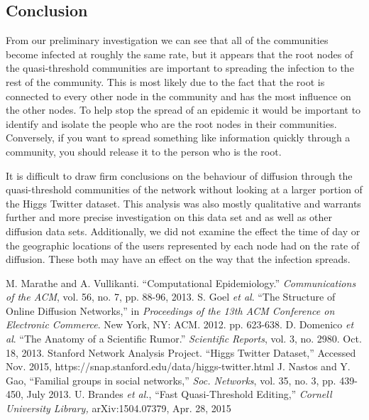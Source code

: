 \documentclass[12pt, oneside, openany]{article} %
\begin{document}
\subsection{Conclusion}
From our preliminary investigation we can see that all of the communities become infected at roughly the same rate, but it appears that the root nodes of the quasi-threshold communities are important to spreading the infection to the rest of the community. This is most likely due to the fact that the root is connected to every other node in the community and has the most influence on the other nodes. To help stop the spread of an epidemic it would be important to identify and isolate the people who are the root nodes in their communities. Conversely, if you want to spread something like information quickly through a community, you should release it to the person who is the root. 

It is difficult to draw firm conclusions on the behaviour of diffusion through the quasi-threshold communities of the network without looking at a larger portion of the Higgs Twitter dataset. This analysis was also mostly qualitative and warrants further and more precise investigation on this data set and as well as other diffusion data sets. Additionally, we did not examine the effect the time of day or the geographic locations of the users represented by each node had on the rate of diffusion. These both may have an effect on the way that the infection spreads.

\newpage
\begin{thebibliography}{1}
 M. Marathe and A. Vullikanti. ``Computational Epidemiology.'' \emph{Communications of the ACM}, vol. 56, no. 7, pp. 88-96, 2013.
 S. Goel \emph{et al}. ``The Structure of Online Diffusion Networks,'' in \emph{Proceedings of the 13th ACM Conference on Electronic Commerce}. New York, NY: ACM. 2012. pp. 623-638.
 D. Domenico \emph{et al}. ``The Anatomy of a Scientific Rumor.'' \emph{Scientific Reports}, vol. 3, no. 2980. Oct. 18, 2013.
Stanford Network Analysis Project. ``Higgs Twitter Dataset,'' Accessed Nov. 2015, https://snap.stanford.edu/data/higgs-twitter.html
J. Nastos and Y. Gao, ``Familial groups in social networks,'' \emph{Soc. Networks}, vol. 35, no. 3, pp. 439-450, July 2013.
U. Brandes \emph{et al.}, ``Fast Quasi-Threshold Editing,'' \emph{Cornell University Library,} arXiv:1504.07379, Apr. 28, 2015
 \end{thebibliography}
\end{document}
